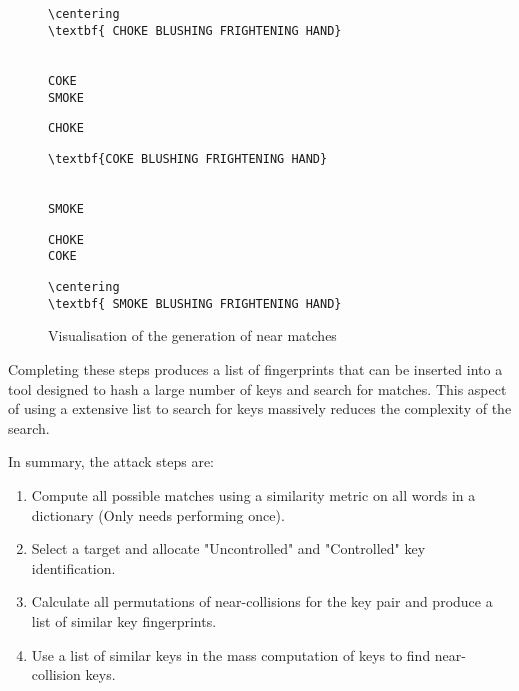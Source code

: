 \begin{figure}[h!]
    \centering
    \begin{BVerbatim}[commandchars=\\\{\}]
        \centering
\textbf{ CHOKE BLUSHING FRIGHTENING HAND}
    \end{BVerbatim}
    \\
    \verb|COKE                           |
    \\
    \verb|SMOKE                          |
    \\
    \hspace{1cm}



    \verb|CHOKE                          |
    \\
    \begin{BVerbatim}[commandchars=\\\{\}]
\textbf{COKE BLUSHING FRIGHTENING HAND}
    \end{BVerbatim}
    \\
    \verb|SMOKE                          |
    \\
    \hspace{1cm}


    \verb|CHOKE                          |
    \\
    \verb|COKE                           |
    \\
    \begin{BVerbatim}[commandchars=\\\{\}]
        \centering
\textbf{ SMOKE BLUSHING FRIGHTENING HAND}
    \end{BVerbatim}
    \caption{Visualisation of the generation of near matches}
    \label{fig:nearMatch}
\end{figure}

Completing these steps produces a list of fingerprints that can be inserted into a tool designed to hash a large number of keys and search for matches. This aspect of using a extensive list to search for keys massively reduces the complexity of the search.

In summary, the attack steps are:

\begin{enumerate}
    \item Compute all possible matches using a similarity metric on all words in a dictionary (Only needs performing once).

    \item Select a target and allocate "Uncontrolled" and "Controlled" key identification.
    
    \item Calculate all permutations of near-collisions for the key pair and produce a list of similar key fingerprints.
    
    \item Use a list of similar keys in the mass computation of keys to find near-collision keys.

\end{enumerate}

